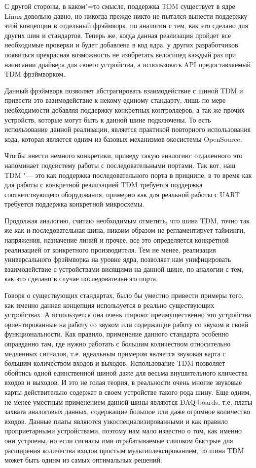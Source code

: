 \documentclass[10pt, a5paper]{article}
\begin{document}
С другой стороны, в каком"=то смысле, поддержка TDM существует в ядре Linux
довольно давно, но никогда прежде никто не пытался вынести поддержку этой
концепции в отдельный фрэймворк, по аналогии с тем, как это сделано для
других шин и стандартов. Теперь же, когда данная реализация пройдет все
необходимые проверки и будет добавлена в код ядра, у других разработчиков
появиться прекрасная возможность не изобретать велосипед каждый раз при
написании драйвера для своего устройства, а использовать API
предоставляемый TDM фрэймворком.

Данный фрэймворк позволяет абстрагировать взаимодействие с шиной TDM и
привести это взаимодействие к некому единому стандарту, лишь по мере
необходимости добавляя поддержку конкретных контроллеров, а так же прочих
устройств, которые могут быть к данной шине подключены. То есть
использование данной реализации, является практикой повторного
использования кода, которая является одним из базовых механизмов
экосистемы OpenSource.

Что бы внести немного конкретики, приведу такую аналогию: отдаленного это
напоминает подсистему работы с последовательными портами. Так вот, наш TDM
"--- это как поддержка последовательного порта в прицнипе, в то время как для
работы с конкретной реализацией TDM требуется поддержка соответствующего
оборудования, примерно как для реальной работы с UART требуется поддержка
конкретной микросхемы.

Продолжая аналогию, считаю необходимым отметить, что шина TDM, точно так
же как и последовательная шина, никоим образом не регламентирует тайминги,
напряжения, назначение линий и прочее, все это определяется конкретной
реализацией от конкретного производителя. Тем не менее, реализация
универсального фрэймворка на уровне ядра, позволяет нам унифицировать
взаимодействие с устройствами висящими на данной шине, по аналогии с тем,
как это сделано в случае последовательного порта.

Говоря о существующих стандартах, было бы уместно привести примеры того,
как именно данная концепция используется в реально существующих
устройствах. А используется она очень широко: преимущественно это
устройства ориентированные на работу со звуком или содержащие работу со
звуком в своей функциональности. Как правило, применение данного стандарта
особенно оправданно там, где нужно работать с большим количеством
относительно медленных сигналов, т.е. идеальным примером является звуковая
карта с большим количеством входов и выходов. Использование TDM позволяет
обойтись одной единственной шиной даже для весьма внушительного кличества
входов и выходов. И это не голая теория, в реальности очень многие
звуковые карты действительно содержат в своем устройстве такого рода шину.
Еще одним, не менее уместным применением данной шины являются DAQ boards,
т.е. платы захвата аналоговых данных, содержащие большое или даже огромное
количество входов. Данные платы являются узкоспециализированными и как
правило проприетарными устройствами, поэтому нам мало известно о том, как
именно они устроены, но если сигналы ими отрабатываемые слишком быстрые
для расширения количества входов простым мультиплексированием, то шина TDM
может быть одинм из самых оптимальных решений.
\end{document}
